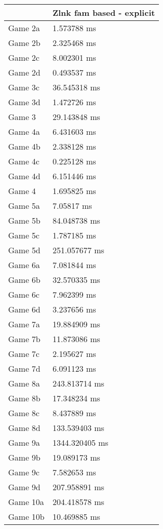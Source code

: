 \begin{tabular}{|l|l|}
	\hline
	& Zlnk fam based - explicit \\ \hline
	Game 2a & 1.573788 ms \\ \hline
	Game 2b & 2.325468 ms \\ \hline
	Game 2c & 8.002301 ms \\ \hline
	Game 2d & 0.493537 ms \\ \hline
	Game 3c & 36.545318 ms \\ \hline
	Game 3d & 1.472726 ms \\ \hline
	Game 3 & 29.143848 ms \\ \hline
	Game 4a & 6.431603 ms \\ \hline
	Game 4b & 2.338128 ms \\ \hline
	Game 4c & 0.225128 ms \\ \hline
	Game 4d & 6.151446 ms \\ \hline
	Game 4 & 1.695825 ms \\ \hline
	Game 5a & 7.05817 ms \\ \hline
	Game 5b & 84.048738 ms \\ \hline
	Game 5c & 1.787185 ms \\ \hline
	Game 5d & 251.057677 ms \\ \hline
	Game 6a & 7.081844 ms \\ \hline
	Game 6b & 32.570335 ms \\ \hline
	Game 6c & 7.962399 ms \\ \hline
	Game 6d & 3.237656 ms \\ \hline
	Game 7a & 19.884909 ms \\ \hline
	Game 7b & 11.873086 ms \\ \hline
	Game 7c & 2.195627 ms \\ \hline
	Game 7d & 6.091123 ms \\ \hline
	Game 8a & 243.813714 ms \\ \hline
	Game 8b & 17.348234 ms \\ \hline
	Game 8c & 8.437889 ms \\ \hline
	Game 8d & 133.539403 ms \\ \hline
	Game 9a & 1344.320405 ms \\ \hline
	Game 9b & 19.089173 ms \\ \hline
	Game 9c & 7.582653 ms \\ \hline
	Game 9d & 207.958891 ms \\ \hline
	Game 10a & 204.418578 ms \\ \hline
	Game 10b & 10.469885 ms \\ \hline

\end{tabular}

